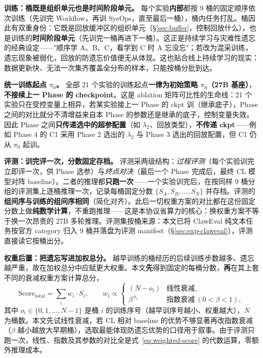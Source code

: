 \textbf{训练：桶既是组织单元也是时间阶段单元。} 每个实验\textbf{内部}都按 9 桶的固定顺序依次训练（先训完 Workflow，再训 SysOps，直至最后一桶），桶内任务打乱。桶因此有双重身份：它既是回放缓冲区的组织单元（\S\ref{sec:buffer}，控制回放什么），也是训练的\textbf{时间阶段单元}（先训完一桶再进下一桶）。这正是持续学习与灾难性遗忘的经典设定——"顺序学 A、B、C，看学到 C 时 A 忘没忘"；若改为混采训练，遗忘现象被弱化，回放的防遗忘价值便无从体现。这也贴合线上持续学习的现实：数据更新快、无法一次集齐覆盖全分布的样本，只能按桶分批到达。

\textbf{统一训练起点 $\pi_0$。} 全部 21 个实验的训练起点\textbf{一律为初始策略 $\pi_0$（27B 基座）}，\textbf{不接续上一 Phase 的 checkpoint}。这是 ablation 矩阵可比性的生命线：21 个实验只在受控变量上相异，若某实验接上一 Phase 的 ckpt 训（继承底子），Phase 之间的对比就分不清增益来自本 Phase 的参数还是继承的底子，控制变量失效。因此 Phase 之间\textbf{只传递选中的超参配置}（如 $\lambda_2$、回放类型），\textbf{不传递 ckpt}——例如 Phase 4 的 C1 采用 Phase 2 选出的 $\lambda_2$ 与 Phase 3 选出的回放配置，但 C1 仍从 $\pi_0$ 起训。

\textbf{评测：训完评一次，分数固定存档。} 评测采两级结构：\textit{过程评测}（每个实验训完立即评一次，供 Phase 选参）与\textit{终点对决}（最后一个 Phase 完成后，最终 CL 模型对阵 baseline）。二者的推理都\textbf{只跑一次}——一个实验训完后，在按同样 9 桶分组的评测集上逐桶推理一次，记录每桶固定分数 $\{S_A, S_B, \dots, S_N\}$ 并存档。评测的\textbf{组间序与训练的组间序相同}（简化对齐）。此后一切权重方案的对比都在这份固定分数上做\textbf{纯数学计算}，不重跑推理——这是本协议省算力的核心：换权重方案不等于换一次昂贵的 27B 多轮推理。评测集按桶来源：本文已将 ClawEval 纯文本任务按官方 category 归入 9 桶并落盘为评测 manifest（\S\ref{sec:exp-claweval}），评测直接读它按桶出分。

\textbf{权重后置：把遗忘写进加权总分。} 越早训练的桶经历的后续训练步数越多、遗忘越严重，故在加权总分中应赋更大权重。本文\textbf{先}得到固定的每桶分数，\textbf{再}在其上套不同的衰减权重方案计算总分，
\begin{equation}
\label{eq:weighted-score}
\mathrm{Score}_{\text{total}} = \sum_{i} w_i \cdot S_i,\qquad
w_i \propto
\begin{cases}
(N - o_i) & \text{线性衰减},\\[2pt]
\beta^{\,o_i} & \text{指数衰减}\ (0<\beta<1),
\end{cases}
\end{equation}
其中 $o_i\in\{0,1,\dots,N-1\}$ 是桶 $i$ 的训练序号（越早训序号越小、权重越大），$N$ 为桶数。本文先试线性衰减，若 CL 相对 baseline 的优势不够显著再改指数衰减（$\beta$ 越小越放大早期桶），选取最能体现防遗忘优势的口径用于叙事。由于评测只跑一次，线性、指数及其参数的对比全是式~\eqref{eq:weighted-score} 的代数运算，零额外推理成本。

